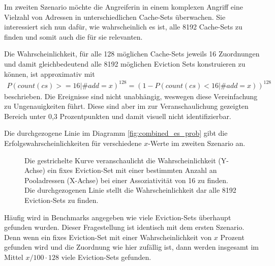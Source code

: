
Im zweiten Szenario möchte die Angreiferin in einem komplexen Angriff eine Vielzahl von Adressen in unterschiedlichen Cache-Sets überwachen. 
Sie interessiert sich nun dafür, wie wahrscheinlich es ist, alle 8192 Cache-Sets zu finden und somit auch die für sie relevanten. 

Die Wahrscheinlichkeit, für alle 128 möglichen Cache-Sets jeweils 16 Zuordnungen und damit gleichbedeutend alle 8192 möglichen Eviction Sets konstruieren zu können, ist approximativ mit
\begin{align*}
P(count(cs)>=16|\#add = x)^{128} = (1-P(count(cs)<16|\#add = x))^{128}
\end{align*}
beschrieben.
Die Ereignisse sind nicht unabhängig, weswegen diese Vereinfachung zu Ungenauigkeiten führt.
Diese sind aber im zur Veranschaulichung gezeigten Bereich unter 0,3 Prozentpunkten und damit visuell nicht identifizierbar.

Die durchgezogene Linie im Diagramm \ref{fig:combined_es_prob} gibt die Erfolgswahrscheinlichkeiten für verschiedene $x$-Werte im zweiten Szenario an. 


\label{fig:combined_es_prob}
\begin{figure}[h]
\centering
\begin{scaletikzpicturetowidth}{\textwidth}

\end{scaletikzpicturetowidth}
\caption{Die gestrichelte Kurve veranschaulicht die Wahrscheinlichkeit (Y-Achse) ein fixes Eviction-Set mit einer bestimmten Anzahl an Pooladressen (X-Achse) bei einer Assoziativität von 16 zu finden. Die durchgezogenen Linie stellt die Wahrscheinlichkeit dar alle 8192 Eviction-Sets zu finden.}
\end{figure}

Häufig wird in Benchmarks angegeben wie viele Eviction-Sets überhaupt gefunden wurden.
Dieser Fragestellung ist identisch mit dem ersten Szenario.
Denn wenn ein fixes Eviction-Set mit einer Wahrscheinlichkeit von $x$ Prozent gefunden wird und die Zuordnung wie hier zufällig ist, dann werden insgesamt im Mittel $x/100 \cdot 128$ viele Eviction-Sets gefunden.

